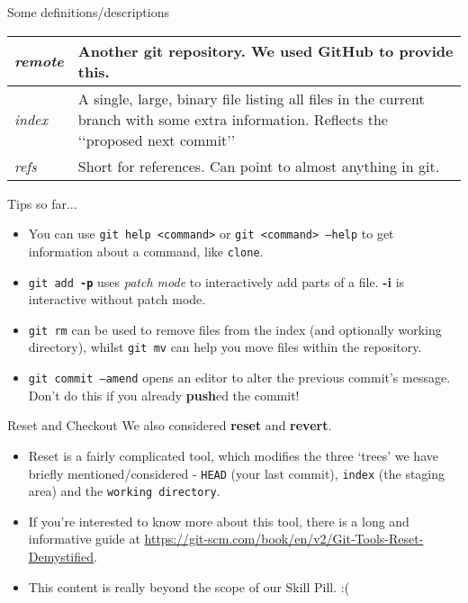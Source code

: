 \documentclass{beamer}
\begin{document}
\begin{frame}{Some definitions/descriptions}
	\renewcommand{\arraystretch}{2.5}
	\begin{tabular}{m{}m{}}
	  \textit{remote} & Another git repository. \newline We used GitHub to provide this. \\
	  \hline
  		\textit{index} & A single, large, binary file listing all files in the current branch with some extra information. \newline Reflects the \lq\lq{}proposed next commit\rq\rq{} \\
  		\hline
	  \textit{refs} & Short for references. \newline Can point to almost anything in git.
  \end{tabular}
  	\renewcommand{\arraystretch}{1}
\end{frame}

\begin{frame}{Tips so far...}
  \begin{itemize}
    \item You can use \texttt{git help <command>} or \texttt{git <command> --help} to get information about a command, like \texttt{clone}.
    \item \texttt{git add \textbf{-p}} uses \textit{patch mode} to interactively add parts of a file. \textbf{-i} is interactive without patch mode.
    \item \texttt{git rm} can be used to remove files from the index (and optionally working directory), whilst \texttt{git mv} can help you move files within the repository.
    \item \texttt{git commit --amend} opens an editor to alter the previous commit's message. Don't do this if you already \textbf{push}ed the commit!
  \end{itemize}
\end{frame}

\begin{frame}{Reset and Checkout}
  We also considered \textbf{reset} and \textbf{revert}.
  \begin{itemize}
    \item Reset is a fairly complicated tool, which modifies the three \lq{}trees\rq{} we have briefly mentioned/considered - \texttt{HEAD} (your last commit), \texttt{index} (the staging area) and the \texttt{working directory}.
    \item If you\rq{}re interested to know more about this tool, there is a long and informative guide at \url{https://git-scm.com/book/en/v2/Git-Tools-Reset-Demystified}.
    \item This content is really beyond the scope of our Skill Pill. :(
  \end{itemize}
\end{frame}
\end{document}

